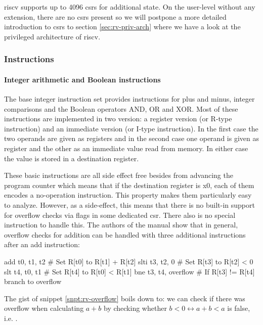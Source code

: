 \gls{riscv} supports up to 4096 \glspl{csr} for additional state.
On the user-level without any extension, there are no \glspl{csr} present so we will postpone a more detailed introduction to \glspl{csr} to section \ref{sec:rv-priv-arch} where we have a look at the privileged architecture of \gls{riscv}.

\subsubsection{Instructions}

\paragraph{Integer arithmetic and Boolean instructions}
The base integer instruction set provides instructions for plus and minus, integer comparisons and the Boolean operators AND, OR and XOR.
Most of these instructions are implemented in two version: a register version (or R-type instruction) and an immediate version (or I-type instruction).
In the first case the two operands are given as registers and in the second case one operand is given as register and the other as an immediate value read from memory.
In either case the value is stored in a destination register.

These basic instructions are all side effect free besides from advancing the program counter which means that if the destination register is x0, each of them encodes a no-operation instruction.
This property makes them particularly easy to analyze.
However, as a side-effect, this means that there is no built-in support for overflow checks via flags in some dedicated \gls{csr}.
There also is no special instruction to handle this.
The authors of the manual show that in general, overflow checks for addition can be handled with three additional instructions after an add instruction:

\begin{assmblr}[caption={General overflow checking \cite{RiscVISA}},label={snpt:rv-overflow}]
add  t0, t1, t2          # Set R[t0] to R[t1] + R[t2]
slti t3, t2, 0           # Set R[t3] to R[t2] < 0
slt  t4, t0, t1          # Set R[t4] to R[t0] < R[t1]
bne  t3, t4, overflow    # If R[t3] != R[t4] branch to overflow
\end{assmblr}

The gist of snippet \ref{snpt:rv-overflow} boils down to: we can check if there was overflow when calculating $ a + b $ by checking whether $ b < 0 \leftrightarrow a + b < a $ is false, i.e. .

